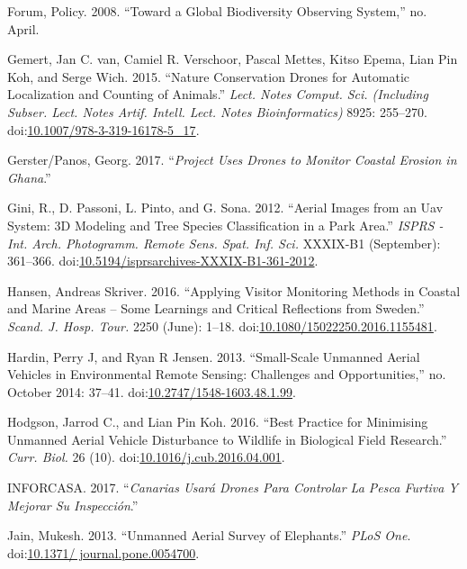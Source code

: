 \documentclass[]{interact}
\theoremstyle{plain}%
\theoremstyle{definition}
\theoremstyle{remark}
\begin{document}
\hypertarget{ref-forum_toward_2008}{}
Forum, Policy. 2008. ``Toward a Global Biodiversity Observing System,''
no. April.

\hypertarget{ref-van_gemert_nature_2015}{}
Gemert, Jan C. van, Camiel R. Verschoor, Pascal Mettes, Kitso Epema,
Lian Pin Koh, and Serge Wich. 2015. ``Nature Conservation Drones for
Automatic Localization and Counting of Animals.'' \emph{Lect. Notes
Comput. Sci. (Including Subser. Lect. Notes Artif. Intell. Lect. Notes
Bioinformatics)} 8925: 255--270.
doi:\href{https://doi.org/10.1007/978-3-319-16178-5_17}{10.1007/978-3-319-16178-5\_17}.

\hypertarget{ref-Georg2016}{}
Gerster/Panos, Georg. 2017. ``\emph{Project Uses Drones to Monitor
Coastal Erosion in Ghana}.''

\hypertarget{ref-gini_aerial_2012}{}
Gini, R., D. Passoni, L. Pinto, and G. Sona. 2012. ``Aerial Images from
an Uav System: 3D Modeling and Tree Species Classification in a Park
Area.'' \emph{ISPRS - Int. Arch. Photogramm. Remote Sens. Spat. Inf.
Sci.} XXXIX-B1 (September): 361--366.
doi:\href{https://doi.org/10.5194/isprsarchives-XXXIX-B1-361-2012}{10.5194/isprsarchives-XXXIX-B1-361-2012}.

\hypertarget{ref-hansen_applying_2016}{}
Hansen, Andreas Skriver. 2016. ``Applying Visitor Monitoring Methods in
Coastal and Marine Areas -- Some Learnings and Critical Reflections from
Sweden.'' \emph{Scand. J. Hosp. Tour.} 2250 (June): 1--18.
doi:\href{https://doi.org/10.1080/15022250.2016.1155481}{10.1080/15022250.2016.1155481}.

\hypertarget{ref-hardin_small-scale_2013}{}
Hardin, Perry J, and Ryan R Jensen. 2013. ``Small-Scale Unmanned Aerial
Vehicles in Environmental Remote Sensing: Challenges and
Opportunities,'' no. October 2014: 37--41.
doi:\href{https://doi.org/10.2747/1548-1603.48.1.99}{10.2747/1548-1603.48.1.99}.

\hypertarget{ref-hodgson_best_2016}{}
Hodgson, Jarrod C., and Lian Pin Koh. 2016. ``Best Practice for
Minimising Unmanned Aerial Vehicle Disturbance to Wildlife in Biological
Field Research.'' \emph{Curr. Biol.} 26 (10).
doi:\href{https://doi.org/10.1016/j.cub.2016.04.001}{10.1016/j.cub.2016.04.001}.

\hypertarget{ref-Canarias2017}{}
INFORCASA. 2017. ``\emph{Canarias Usará Drones Para Controlar La Pesca
Furtiva Y Mejorar Su Inspección}.''

\hypertarget{ref-jain_unmanned_2013}{}
Jain, Mukesh. 2013. ``Unmanned Aerial Survey of Elephants.'' \emph{PLoS
One}.
doi:\href{https://doi.org/10.1371/\%20journal.pone.0054700}{10.1371/ journal.pone.0054700}.
\end{document}
